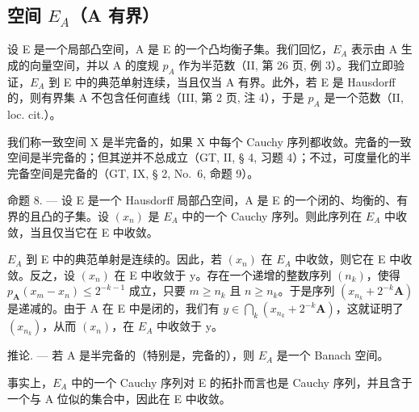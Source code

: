 \subsection{\texorpdfstring{空间 \(E_{A}\)（A 有界）}{空间 E\_\{A\}（A 有界）}}

设 E 是一个局部凸空间，A 是 E 的一个凸均衡子集。我们回忆，\(E_{A}\) 表示由 A 生成的向量空间，并以 A 的度规 \(p_{A}\) 作为半范数（II, 第 26 页, 例 3）。我们立即验证，\(E_{A}\) 到 E 中的典范单射连续，当且仅当 A 有界。此外，若 E 是 Hausdorff 的，则有界集 A 不包含任何直线（III, 第 2 页, 注 4），于是 \(p_{A}\) 是一个范数（II, loc. cit.）。

我们称一致空间 X 是半完备的，如果 X 中每个 Cauchy 序列都收敛。完备的一致空间是半完备的；但其逆并不总成立（GT, II, § 4, 习题 4）；不过，可度量化的半完备空间是完备的（GT, IX, § 2, No.~6, 命题 9）。

命题 8. --- 设 E 是一个 Hausdorff 局部凸空间，A 是 E 的一个闭的、均衡的、有界的且凸的子集。设 \((x_{n})\) 是 \(E_{A}\) 中的一个 Cauchy 序列。则此序列在 \(E_{A}\) 中收敛，当且仅当它在 E 中收敛。

\(E_{A}\) 到 E 中的典范单射是连续的。因此，若 \((x_{n})\) 在 \(E_{A}\) 中收敛，则它在 E 中收敛。反之，设 \((x_{n})\) 在 E 中收敛于 y。存在一个递增的整数序列 \((n_{k})\)，使得 \(p_{\mathbf{A}}(x_{m}-x_{n}) \leqslant 2^{-k-1}\) 成立，只要 \(m \geqslant n_{k}\) 且 \(n \geqslant n_{k}\)。于是序列 \((x_{n_{k}} + 2^{-k}\mathbf{A})\) 是递减的。由于 A 在 E 中是闭的，我们有 \(y \in \bigcap_{k} (x_{n_{k}} + 2^{-k}\mathbf{A})\)，这就证明了 \((x_{n_{k}})\)，从而 \((x_{n})\)，在 \(E_{A}\) 中收敛于 y。

推论. --- 若 A 是半完备的（特别是，完备的），则 \(E_{A}\) 是一个 Banach 空间。

事实上，\(E_{A}\) 中的一个 Cauchy 序列对 E 的拓扑而言也是 Cauchy 序列，并且含于一个与 A 位似的集合中，因此在 E 中收敛。

